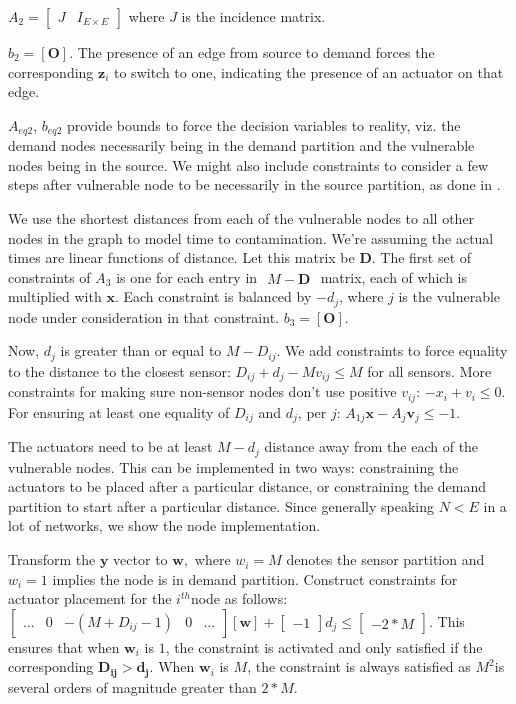 \documentclass[authoryear,preprint,review,12pt]{elsarticle}
\begin{document}
$A_{2}=\left[\begin{array}{cc}
J & I_{E\times E}\end{array}\right]$ where $J$ is the incidence matrix.

$b_{2}=\left[\mathbf{O}\right]$. The presence of an edge from source
to demand forces the corresponding $\mathbf{z}_{i}$ to switch to
one, indicating the presence of an actuator on that edge.

$A_{eq2}$, $b_{eq2}$ provide bounds to force the decision variables
to reality, viz. the demand nodes necessarily being in the demand
partition and the vulnerable nodes being in the source. We might also
include constraints to consider a few steps after vulnerable node
to be necessarily in the source partition, as done in \cite{palleti_actuator_2018}.

We use the shortest distances from each of the vulnerable nodes to
all other nodes in the graph to model time to contamination. We're
assuming the actual times are linear functions of distance. Let this
matrix be $\mathbf{D}$. The first set of constraints of $A_{3}$
is one for each entry in $\begin{array}{c}
M-\mathbf{D}\end{array}$ matrix, each of which is multiplied with $\mathbf{x}$. Each constraint
is balanced by $-d_{j}$, where $j$ is the vulnerable node under
consideration in that constraint. $b_{3}=\left[\mathbf{O}\right].$

Now, $d_{j}$ is greater than or equal to $M-D$$_{ij}$. We add constraints
to force equality to the distance to the closest sensor: $D_{ij}+d_{j}-Mv_{ij}\leq M$
for all sensors. \label{v-inequality-at-sensor-nodes}More constraints
for making sure non-sensor nodes don't use positive $v_{ij}$: $-x_{i}+v_{i}\leq0$.
For ensuring at least one equality of $D{}_{ij}$ and $d_{j}$, per
$j$: $A_{1j}\mathbf{x}-A_{j}\mathbf{v}_{j}\leq-1$.

The actuators need to be at least $M-d_{j}$ distance away from the
each of the vulnerable nodes. This can be implemented in two ways:
constraining the actuators to be placed after a particular distance,
or constraining the demand partition to start after a particular distance.
Since generally speaking $N<E$ in a lot of networks, we show the
node implementation.

Transform the $\mathbf{y}$ vector to $\mathbf{w},$ where $w_{i}=M$
denotes the sensor partition and $w_{i}=1$ implies the node is in
demand partition. Construct constraints for actuator placement for
the $i^{th}$node as follows: $\left[\begin{array}{ccccc}
... & 0 & -(M+D_{ij}-1) & 0 & ...\end{array}\right]\left[\mathbf{\mathbf{w}}\right]+\left[\begin{array}{c}
-1\end{array}\right]d_{j}\leq\left[\begin{array}{c}
-2*M\end{array}\right]$. This ensures that when $\mathbf{w}_{i}$ is $1$, the constraint
is activated and only satisfied if the corresponding $\mathbf{D_{ij}>d_{j}}$.
When $\mathbf{w}_{i}$ is $M$, the constraint is always satisfied
as $M^{2}$is several orders of magnitude greater than $2*M$.
\end{document}
